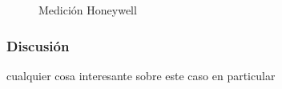\begin{figure}[H]
\begin{minipage}{0.5\linewidth}
     \caption{Medición Honeywell}\label{fig:Honeywell-src-  info}
   \end{minipage}
 \end{figure}

\subsubsection{Discusión}

cualquier cosa interesante sobre este caso en particular
